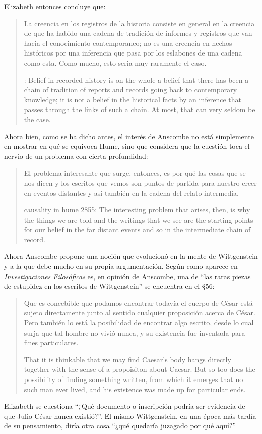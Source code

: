 Elizabeth entonces concluye que: \blockquote[{\cite[89]{anscombe1981parmenides:humeandjulius}}: Belief in recorded history is on the whole a belief that there has been a chain of tradition of reports and records going back to contemporary knowledge; it is not a belief in the historical facts by an inference that passes through the links of such a chain. At most, that can very seldom be the case.]{La creencia en los registros de la historia consiste en general en la creencia de que ha habido una cadena de tradición de informes y registros que van hacia el conocimiento contemporaneo; no es una creencia en hechos históricos por una inferencia que pasa por los eslabones de una cadena como esta. Como mucho, esto seria muy raramente el caso.}

Ahora bien, como se ha dicho antes, el interés de Anscombe no está simplemente en mostrar en qué se equivoca Hume, sino que considera que la cuestión toca el nervio de un problema con cierta profundidad: \blockquote[causality in hume 2855: The interesting problem that arises, then, is why the things we are told and the writings that we see are the starting points for our belief in the far distant events and so in the intermediate chain of record.]{El problema interesante que surge, entonces, es por qué las cosas que se nos dicen y los escritos que vemos son puntos de partida para nuestro creer en eventos distantes y así también en la cadena del relato intermedia.}



Ahora Anscombe propone una noción que evolucionó en la mente de Wittgenstein y a la que debe mucho en su propia argumentación.
Según como aparece en \emph{Investigaciones Filosóficas} es, en opinión de Anscombe, una de \enquote{las raras piezas de estupidez en los escritos de Wittgenstein} se encuentra en el \S56: \blockquote[That it is thinkable that we may find Caesar's body hangs directly together with the sense of a propoisiton about Caesar. But so too does the possibility of finding something written, from which it emerges that no such man ever lived, and his existence was made up for particular ends.]{Que es concebible que podamos encontrar todavía el cuerpo de César está sujeto directamente junto al sentido cualquier proposición acerca de César. Pero también lo está la posibilidad de encontrar algo escrito, desde lo cual surja que tal hombre no vivió nunca, y su existencia fue inventada para fines particulares.} Elizabeth se cuestiona \enquote{¿Qué documento o inscripción podría ser evidencia de que Julio César nunca existió?}. El mismo Wittgenstein, en una época más tardía de su pensamiento, diría otra cosa \enquote{¿qué quedaría juzagado por qué aquí?}

